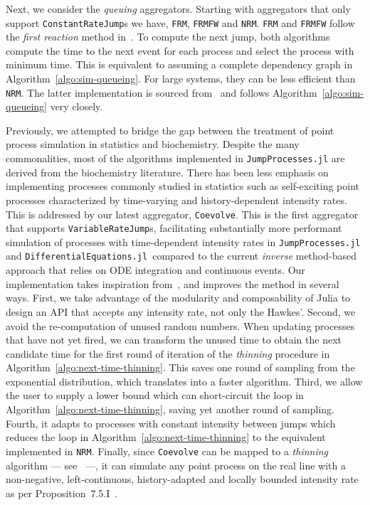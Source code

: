 \documentclass{juliacon}
\begin{document}
Next, we consider the \textit{queuing} aggregators. Starting with aggregators that only support \texttt{ConstantRateJump}s we have, \texttt{FRM}, \texttt{FRMFW} and \texttt{NRM}. \texttt{FRM} and \texttt{FRMFW} follow the \textit{first reaction} method in~\cite{gillespie1976}. To compute the next jump, both algorithms compute the time to the next event for each process and select the process with minimum time. This is equivalent to assuming a complete dependency graph in Algorithm~\ref{algo:sim-queueing}. For large systems, they can be less efficient than \texttt{NRM}. The latter implementation is sourced from~\cite{gibson2000} and follows Algorithm~\ref{algo:sim-queueing} very closely.

Previously, we attempted to bridge the gap between the treatment of point process simulation in statistics and biochemistry. Despite the many commonalities, most of the algorithms implemented in \texttt{JumpProcesses.jl} are derived from the biochemistry literature. There has been less emphasis on implementing processes commonly studied in statistics such as self-exciting point processes characterized by time-varying and history-dependent intensity rates. This is addressed by our latest aggregator, \texttt{Coevolve}. This is the first aggregator that supports \texttt{VariableRateJump}s, facilitating substantially more performant simulation of processes with time-dependent intensity rates in \texttt{JumpProcesses.jl} and \texttt{DifferentialEquations.jl }compared to the current \textit{inverse} method-based approach that relies on ODE integration and continuous events. Our implementation takes inspiration from~\cite{farajtabar2017}, and improves the method in several ways. First, we take advantage of the modularity and composability of Julia to design an API that accepts any intensity rate, not only the Hawkes'. Second, we avoid the re-computation of unused random numbers. When updating processes that have not yet fired, we can transform the unused time to obtain the next candidate time for the first round of iteration of the \textit{thinning} procedure in Algorithm~\ref{algo:next-time-thinning}. This saves one round of sampling from the exponential distribution, which translates into a faster algorithm. Third, we allow the user to supply a lower bound which can short-circuit the loop in Algorithm~\ref{algo:next-time-thinning}, saving yet another round of sampling. Fourth, it adapts to processes with constant intensity between jumps which reduces the loop in Algorithm~\ref{algo:next-time-thinning} to the equivalent implemented in \texttt{NRM}. Finally, since \texttt{Coevolve} can be mapped to a \textit{thinning} algorithm --- see~\cite{farajtabar2017} ---, it can simulate any point process on the real line with a non-negative, left-continuous, history-adapted and locally bounded intensity rate as per Proposition~7.5.I~\cite{daley2003}.
\end{document}
